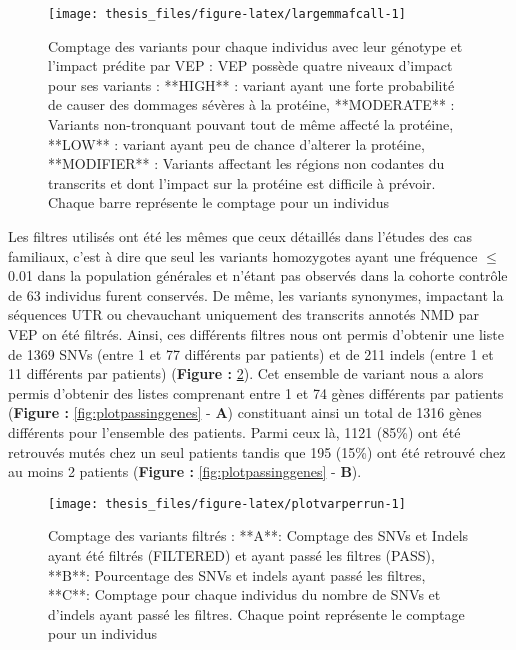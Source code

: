 \documentclass[12pt,twoside]{reedthesis}
\theoremstyle{definition}
\theoremstyle{definition}
\theoremstyle{remark}
\begin{document}
  \begin{figure}
  
  {\centering \texttt{[image: thesis\_files/figure-latex/largemmafcall-1]} 
  
  }
  
  \caption[Comptage des variants pour chaque individus avec leur génotype et l'impact prédite par VEP]{Comptage des variants pour chaque individus avec leur génotype et l'impact prédite par VEP  :  VEP possède quatre niveaux d'impact pour ses variants : **HIGH** : variant ayant une forte probabilité de causer des dommages sévères à la protéine, **MODERATE** : Variants non-tronquant pouvant tout de même affecté la protéine, **LOW** : variant ayant peu de chance d'alterer la protéine, **MODIFIER** :  Variants affectant les régions non codantes du transcrits et dont l'impact sur la protéine est difficile à prévoir. Chaque barre représente le comptage pour un individus}\label{fig:largemmafcall}
  \end{figure}
  
  Les filtres utilisés ont été les mêmes que ceux détaillés dans l'études
  des cas familiaux, c'est à dire que seul les variants homozygotes ayant
  une fréquence \(\le\) 0.01 dans la population générales et n'étant pas
  observés dans la cohorte contrôle de 63 individus furent conservés. De
  même, les variants synonymes, impactant la séquences UTR ou chevauchant
  uniquement des transcrits annotés NMD par VEP on été filtrés. Ainsi, ces
  différents filtres nous ont permis d'obtenir une liste de 1369 SNVs
  (entre 1 et 77 différents par patients) et de 211 indels (entre 1 et 11
  différents par patients) (\textbf{Figure : }\ref{fig:plotvarperrun}).
  Cet ensemble de variant nous a alors permis d'obtenir des listes
  comprenant entre 1 et 74 gènes différents par patients (\textbf{Figure :
  }\ref{fig:plotpassinggenes} - \textbf{A}) constituant ainsi un total de
  1316 gènes différents pour l'ensemble des patients. Parmi ceux là, 1121
  (85\%) ont été retrouvés mutés chez un seul patients tandis que 195
  (15\%) ont été retrouvé chez au moins 2 patients (\textbf{Figure :
  }\ref{fig:plotpassinggenes} - \textbf{B}).
  
  \begin{figure}
  
  {\centering \texttt{[image: thesis\_files/figure-latex/plotvarperrun-1]} 
  
  }
  
  \caption[Comptage des variants filtrés]{Comptage des variants filtrés  :  **A**: Comptage des SNVs et Indels ayant été filtrés (FILTERED) et ayant passé les filtres (PASS), **B**: Pourcentage des SNVs et indels ayant passé les filtres, **C**: Comptage pour chaque individus du nombre de SNVs et d'indels ayant passé les filtres. Chaque point représente le comptage pour un individus}\label{fig:plotvarperrun}
  \end{figure}
  
\end{document}
